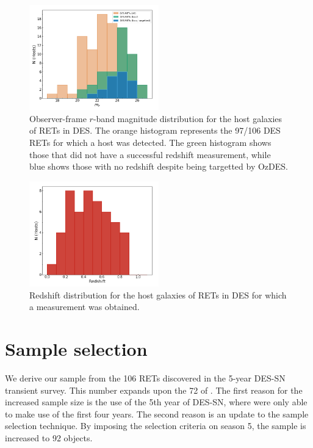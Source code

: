 \documentclass[fleqn,usenatbib,]{mnras}
\begin{document}
\begin{figure}
\includegraphics[width=0.5\textwidth]{figs/mag_dist.png}
\caption{Observer-frame $r$-band magnitude distribution for the host galaxies of RETs in DES. The orange histogram represents the 97/106 DES RETs for which a host was detected. The green histogram shows those that did not have a successful redshift measurement, while blue shows those with no redshift despite being targetted by OzDES.
\label{fig:mag_dist}}
\end{figure}

\begin{figure}
\includegraphics[width=0.5\textwidth]{figs/z_dist.png}
\caption{Redshift distribution for the host galaxies of RETs in DES for which a measurement was obtained.
\label{fig:z_dist}}
\end{figure}

\section{Sample selection\label{sec:sample}}

We derive our sample from the 106 RETs discovered in the 5-year DES-SN transient survey. This number expands upon the 72 of . The first reason for the increased sample size is the use of the 5th year of DES-SN, where  were only able to make use of the first four years. The second reason is an update to the sample selection technique. By imposing the  selection criteria on season 5, the sample is increased to 92 objects.
\end{document}

